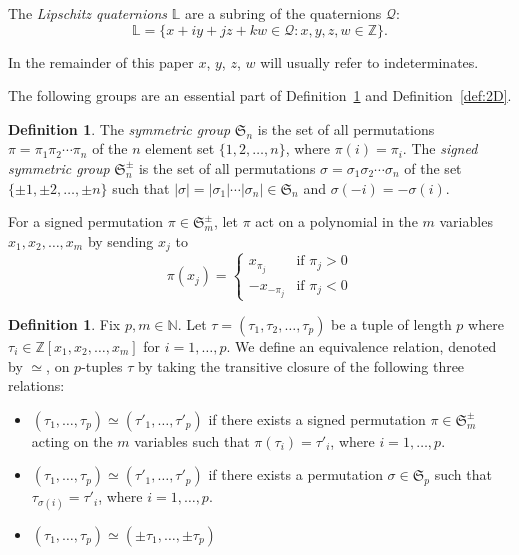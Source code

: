 \documentclass[12pt,table]{article}
\theoremstyle{definition}
\newtheorem{definition}[theorem]{Definition}
\theoremstyle{remark}
\newcommand{\Nnn}{\mathbb N}
\newcommand{\Zzz}{\mathbb Z}
\newcommand{\Lll}{\mathbb L}
\numberwithin{equation}{section}
\begin{document}
The \emph{Lipschitz quaternions} $ \Lll $ are a subring of
the quaternions $\mathscr{Q}$:
\[
\Lll = \{ x + iy + jz + kw \in \mathscr{Q}: x,y,z,w \in \Zzz \}.
\]


In the remainder of this paper $x$, $y$, $z$, $w$ will
usually refer to indeterminates.



The following groups are an essential part of Definition~\ref{def:general}
and Definition~\ref{def:2D}.
\begin{definition}
The {\em symmetric group} $ \mathfrak{S}_n $ is the 
set of all permutations $ \pi = \pi_1 \pi_2 \dotsm \pi_n $ 
of the $ n $ element set $ \{ 1, 2, \dotsc, n \} $,
where $ \pi(i) = \pi_i $.
The {\em signed symmetric group} $ \mathfrak{S}_n^\pm $
is the set of all permutations $ \sigma = \sigma_1 \sigma_2 \dotsm \sigma_n$
of the set $ \{ \pm 1, \pm 2, \dotsc, \pm n \} $ such that
$ | \sigma | = | \sigma_1 | \dotsm |\sigma_n| \in \mathfrak{S}_n $
and $ \sigma(-i) =  -\sigma(i) $.   
\end{definition}



For a signed permutation $ \pi \in \mathfrak{S}_m^\pm $,
let $ \pi $ act on a polynomial in the 
$m$ variables $ x_1,x_2, \dotsc, x_m $ by sending $ x_j $ to 
\[
\pi(x_j) =
\begin{cases}
x_{\pi_j} & \text{if } \pi_j > 0 \\
-x_{-\pi_j} & \text{if } \pi_j < 0
\end{cases}
\]

\begin{definition}
\label{def:general}
Fix $ p, m \in \Nnn $. 
Let $ \tau = ( \tau_1, \tau_2, \dotsc, \tau_p) $
be a tuple of length $ p $ where 
$ \tau_i \in \Zzz[x_1,x_2, \dotsc, x_m] $ for $ i = 1, \dotsc, p $.
We define an equivalence relation, denoted by $ \simeq $, on $p$-tuples
$ \tau $ 
by taking the transitive closure of the following three relations:
\begin{itemize}
\item
$ ( \tau_1, \dotsc, \tau_p) \simeq ( \tau'_1, \dotsc, \tau'_p) $
if there exists a signed permutation $ \pi \in \mathfrak{S}_m^\pm $
acting on the $ m $ variables such that $ \pi( \tau_i ) = \tau'_i $,
 where $ i = 1, \dotsc, p $.
\item
$ ( \tau_1, \dotsc, \tau_p) \simeq ( \tau'_1, \dotsc, \tau'_p) $
if there exists a permutation $ \sigma \in \mathfrak{S}_p $
such that $ \tau_{\sigma(i)} = \tau'_i $, where $ i = 1, \dotsc, p $.
\item
$ ( \tau_1, \dotsc, \tau_p) \simeq ( \pm \tau_1, \dotsc, \pm \tau_p) $
\end{itemize}
\end{definition}
\end{document}
